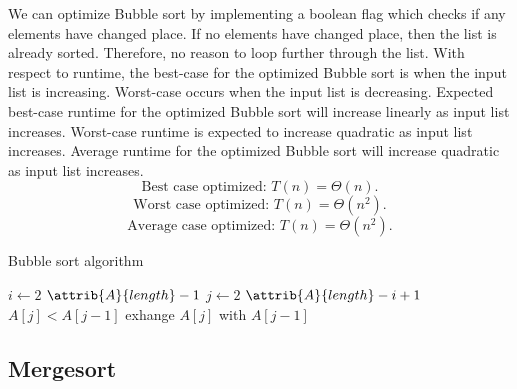 \documentclass[sigconf, nonacm, natbib, screen, balance=False]{acmart}
\begin{document}
We can optimize Bubble sort by implementing a boolean flag which checks if any elements have changed place. If no elements have changed place, then the list is already sorted. Therefore, no reason to loop further through the list. With respect to runtime, the best-case for the optimized Bubble sort is when the input list is increasing. Worst-case occurs when the input list is decreasing. Expected best-case runtime for the optimized Bubble sort will increase linearly as input list increases. Worst-case runtime is expected to increase quadratic as input list increases. Average runtime for the optimized Bubble sort will increase quadratic as input list increases.
\begin{equation*}
 \text{Best case optimized: } T(n) = \Theta(n). 
\end{equation*}
\begin{equation*}
 \text{Worst case optimized: } T(n) = \Theta(n^2). 
\end{equation*}
\begin{equation*}
 \text{Average case optimized: } T(n) = \Theta(n^2). 
\end{equation*}
\citet{bubble_sort}
	\begin{listing}
	  \caption{Bubble sort algorithm \citet[Ch.~2]{CLRS_2009} }
	  \label{lst:bubble_algo}
	  \begin{codebox}
	    \li \For $i \gets 2$ \To $\attrib{A}{length}-1$
	    \Do
	    \li \For $j \gets 2$ \To $\attrib{A}{length}-i+1$
	    \Do
	    \li \If $ A[j] < A[j-1]$
	    \Do
	    \li exhange $A[j]$ with $A[j-1]$
	    \End
	    \End
	  \end{codebox}
	\end{listing}
\FloatBarrier
\subsection{Mergesort }\label{sec:algo3}
\end{document}
